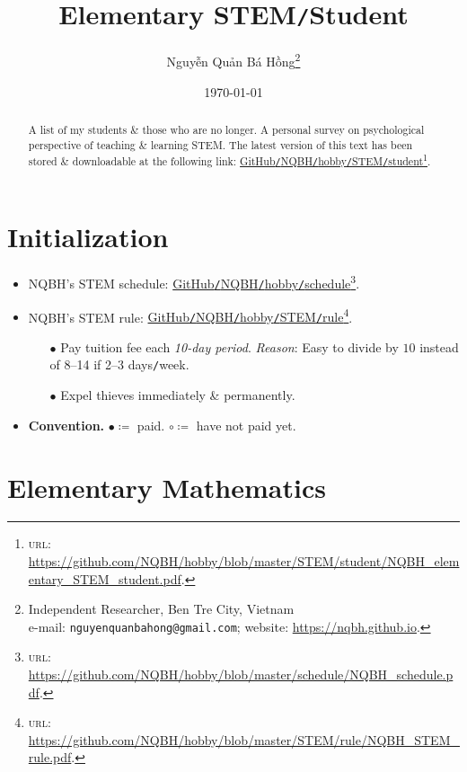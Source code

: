 \documentclass{article}
\title{Elementary STEM\texttt{/}Student}
\author{\selectlanguage{vietnamese} Nguyễn Quản Bá Hồng\footnote{Independent Researcher, Ben Tre City, Vietnam\\e-mail: \texttt{nguyenquanbahong@gmail.com}; website: \url{https://nqbh.github.io}.}}
\date{\today}
\numberwithin{equation}{section}
\begin{document}
\maketitle
\begin{abstract}
	A list of my students \& those who are no longer. A personal survey on psychological perspective of teaching \& learning STEM. The latest version of this text has been stored \& downloadable at the following link: \href{https://github.com/NQBH/hobby/blob/master/STEM/student/NQBH_elementary_STEM_student.pdf}{GitHub\texttt{/}NQBH\texttt{/}hobby\texttt{/}STEM\texttt{/}student}\footnote{\textsc{url}: \url{https://github.com/NQBH/hobby/blob/master/STEM/student/NQBH_elementary_STEM_student.pdf}.}.
\end{abstract}
\tableofcontents
\newpage


\section*{Initialization}
\begin{itemize}
	\item NQBH's STEM schedule: \href{https://github.com/NQBH/hobby/blob/master/schedule/NQBH_schedule.pdf}{GitHub\texttt{/}NQBH\texttt{/}hobby\texttt{/}schedule}\footnote{\textsc{url}: \url{https://github.com/NQBH/hobby/blob/master/schedule/NQBH_schedule.pdf}.}.
	\item NQBH's STEM rule: \href{https://github.com/NQBH/hobby/blob/master/STEM/rule/NQBH_STEM_rule.pdf}{GitHub\texttt{/}NQBH\texttt{/}hobby\texttt{/}STEM\texttt{/}rule}\footnote{\textsc{url}: \url{https://github.com/NQBH/hobby/blob/master/STEM/rule/NQBH_STEM_rule.pdf}.}.
	\begin{itemize}
		\item[$\bullet$] Pay tuition fee each \textit{10-day period}. \textit{Reason}: Easy to divide by $10$ instead of 8--14 if 2--3 days\texttt{/}week.
		\item[$\bullet$] Expel thieves immediately \& permanently.
	\end{itemize}
	\item \textbf{Convention.} $\bullet\coloneq$ paid. $\circ\coloneq$ have not paid yet. 
\end{itemize}


\section{Elementary Mathematics}
\end{document}
